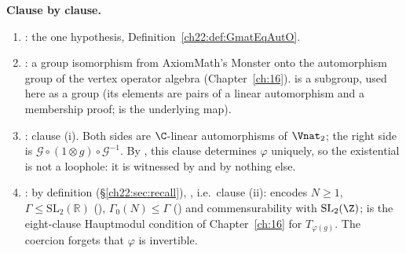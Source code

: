 \begin{dictionary}
\textbf{Clause by clause.}
\begin{enumerate}[label=(\arabic*)]
\item {}: the one hypothesis, Definition~\ref{ch22:def:GmatEqAutO}.
\item {}: a group isomorphism from AxiomMath's Monster onto the automorphism group of the vertex
  operator algebra  (Chapter~\ref{ch:16}).   is a subgroup, used here as a group (its elements are
  pairs of a linear automorphism and a membership proof;  is the underlying map).
\item {}: clause (i).  Both sides are
  $\C$-linear automorphisms of $\Vnat_2$; the right side is $\mathcal G\circ(1\otimes g)\circ\mathcal G^{-1}$.  By
  , this clause determines $\varphi$ uniquely, so the existential is not a loophole:
  it is witnessed by  and by nothing else.
\item {}: by definition (\S\ref{ch22:sec:recall}),
  , i.e.\ clause (ii):  encodes $N\ge1$,
  $\Gamma\le\mathrm{SL}_2(\mathbb{R})$ (), $\Gamma_0(N)\le\Gamma$ () and commensurability with
  $\mathrm{SL}_2(\Z)$;  is the eight-clause Hauptmodul condition of
  Chapter~\ref{ch:16} for $T_{\varphi(g)}$.  The coercion  forgets that $\varphi$ is invertible.
\end{enumerate}


\end{dictionary}
